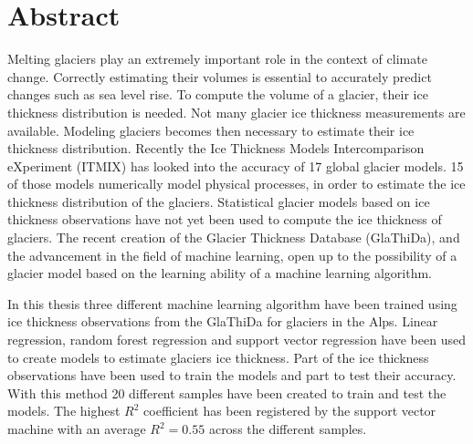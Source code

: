 \chapter*{Abstract}
\thispagestyle{plain}
Melting glaciers play an extremely important role in the context of climate change. Correctly estimating their volumes is essential to accurately predict changes such as sea level rise. To compute the volume of a glacier, their ice thickness distribution is needed. Not many glacier ice thickness measurements are available. Modeling glaciers becomes then necessary to estimate their ice thickness distribution. Recently the Ice Thickness Models Intercomparison eXperiment (ITMIX) has looked into the accuracy of 17 global glacier models. 15 of those models numerically model physical processes, in order to estimate the ice thickness distribution of the glaciers. Statistical glacier models based on ice thickness observations have not yet been used to compute the ice thickness of glaciers. The recent creation of the Glacier Thickness Database (GlaThiDa), and the advancement in the field of machine learning, open up to the possibility of a glacier model based on the learning ability of a machine learning algorithm.

In this thesis three different machine learning algorithm have been trained using ice thickness observations from the GlaThiDa for glaciers in the Alps. Linear regression, random forest regression and support vector regression have been used to create models to estimate glaciers ice thickness. Part of the ice thickness observations have been used to train the models and part to test their accuracy. With this method 20 different samples have been created to train and test the models. The highest $R^2$ coefficient has been registered by the support vector machine with an average $R^2=0.55$ across the different samples. 

